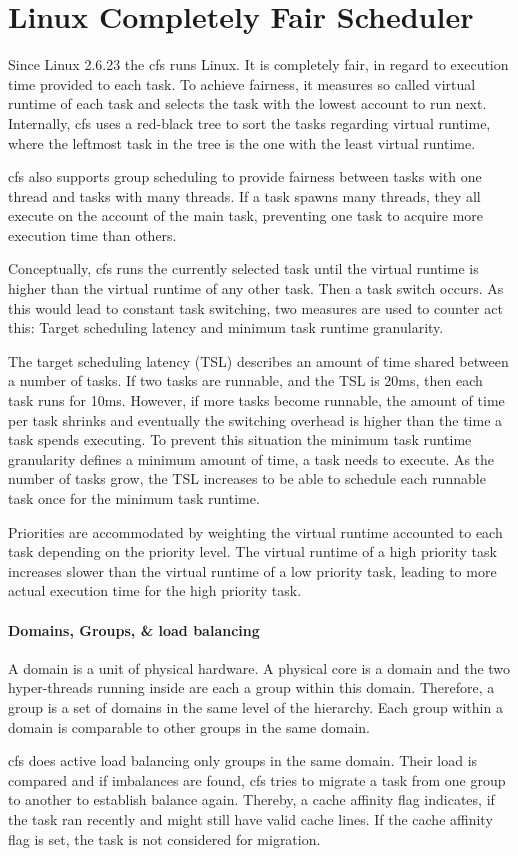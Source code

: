 \section{Linux Completely Fair Scheduler}
\label{state:cfs}


Since Linux 2.6.23 the \gls{cfs} runs Linux.
It is completely fair, in regard to execution time provided to each task.
To achieve fairness, it measures so called virtual runtime of each task and
selects the task with the lowest account to run next.
Internally, \gls{cfs} uses a red-black tree to sort the tasks regarding virtual
runtime, where the leftmost task in the tree is the one with the least virtual
runtime.

\gls{cfs} also supports group scheduling to provide fairness between tasks with one
thread and tasks with many threads.
If a task spawns many threads, they all execute on the account of the main
task, preventing one task to acquire more execution time than others.

Conceptually, \gls{cfs} runs the currently selected task until the virtual runtime is
higher than the virtual runtime of any other task.
Then a task switch occurs.
As this would lead to constant task switching, two measures are used to counter
act this: Target scheduling latency and minimum task runtime granularity.

The target scheduling latency (TSL) describes an amount of time shared between a
number of tasks.
If two tasks are runnable, and the TSL is 20ms, then each task runs for 10ms.
However, if more tasks become runnable, the amount of time per task shrinks and
eventually the switching overhead is higher than the time a task spends
executing.
To prevent this situation the minimum task runtime granularity defines a
minimum amount of time, a task needs to execute.
As the number of tasks grow, the TSL increases to be able to schedule each
runnable task once for the minimum task runtime.

Priorities are accommodated by weighting the virtual runtime accounted to each
task depending on the priority level.
The virtual runtime of a high priority task increases slower than the virtual
runtime of a low priority task, leading to more actual execution time for the
high priority task.

\paragraph{Domains, Groups, \& load balancing}
A domain is a unit of physical hardware.
A physical core is a domain and the two hyper-threads running inside are each a
group within this domain.
Therefore, a group is a set of domains in the same level of the hierarchy.
Each group within a domain is comparable to other groups in the same domain.

\gls{cfs} does active load balancing only groups in the same domain.
Their load is compared and if imbalances are found, \gls{cfs} tries to migrate a task
from one group to another to establish balance again.
Thereby, a cache affinity flag indicates, if the task ran recently and might
still have valid cache lines.
If the cache affinity flag is set, the task is not considered for migration.
